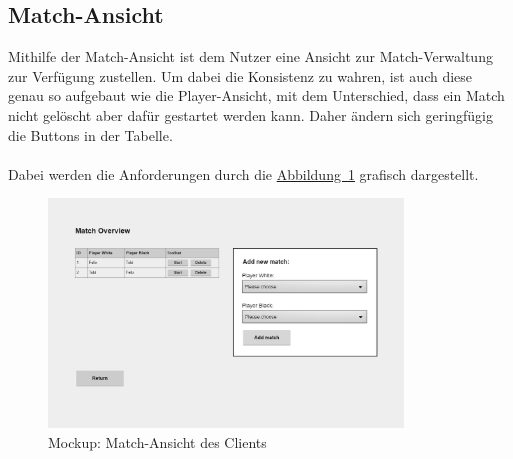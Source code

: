 \subsection{Match-Ansicht}\label{sec:matchView}
Mithilfe der Match-Ansicht ist dem Nutzer eine Ansicht zur Match-Verwaltung zur Verfügung zustellen. Um dabei die Konsistenz zu wahren, ist auch diese genau so aufgebaut wie die Player-Ansicht, mit dem Unterschied, dass ein Match nicht gelöscht aber dafür gestartet werden kann. Daher ändern sich geringfügig die Buttons in der Tabelle.\\
\\
Dabei werden die Anforderungen durch die \hyperref[fig:matchView]{Abbildung~\ref{fig:matchView}} grafisch dargestellt.
\begin{figure}[htb]
	\includegraphics[width=0.84\textwidth]{images/match-view.png}
	\caption{Mockup: Match-Ansicht des Clients}
	\label{fig:matchView}
\end{figure}

